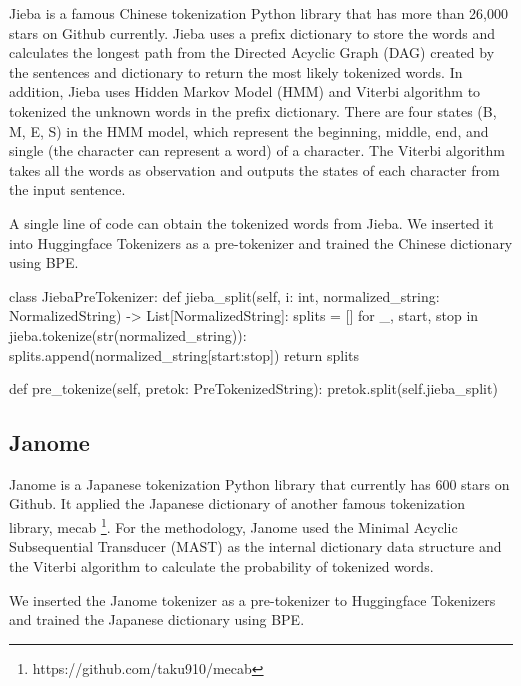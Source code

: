 Jieba is a famous Chinese tokenization Python library that has more than 26,000 stars on Github currently. Jieba uses a prefix dictionary to store the words and calculates the longest path from the Directed Acyclic Graph (DAG) created by the sentences and dictionary to return the most likely tokenized words. In addition, Jieba uses Hidden Markov Model (HMM) and Viterbi algorithm to tokenized the unknown words in the prefix dictionary. There are four states (B, M, E, S) in the HMM model, which represent the beginning, middle, end, and single (the character can represent a word) of a character. The Viterbi algorithm takes all the words as observation and outputs the states of each character from the input sentence. 

A single line of code  can obtain the tokenized words from Jieba. We inserted it into Huggingface Tokenizers as a pre-tokenizer and trained the Chinese dictionary using BPE.

\vspace{0.5cm}

\begin{python}
    class JiebaPreTokenizer:
    def jieba_split(self, i: int, normalized_string: NormalizedString) -> List[NormalizedString]:
        splits = []
        for _, start, stop in jieba.tokenize(str(normalized_string)):
            splits.append(normalized_string[start:stop])
        return splits
    
    def pre_tokenize(self, pretok: PreTokenizedString):
         pretok.split(self.jieba_split)
\end{python}

\newpage

\subsection{Janome} \label{sec:janome}

Janome is a Japanese tokenization Python library that currently has 600 stars on Github. It applied the Japanese dictionary of another famous tokenization library, mecab \footnote{https://github.com/taku910/mecab}. For the methodology, Janome used the Minimal Acyclic Subsequential Transducer (MAST) as the internal dictionary data structure and the Viterbi algorithm to calculate the probability of tokenized words.

We inserted the Janome tokenizer as a pre-tokenizer to Huggingface Tokenizers and trained the Japanese dictionary using BPE.

